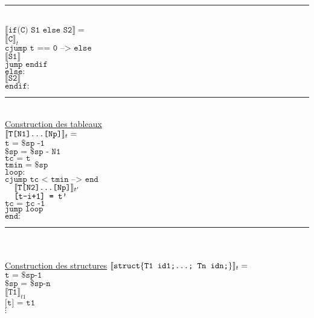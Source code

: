 \documentclass[12pt,twocolumn]{report}
\begin{document}
    \rule{3cm}{0.1pt}\\
    $\llbracket \texttt{if(C) S1 else S2} \rrbracket =$\\
    \hphantom{aaaaaa}$\llbracket \texttt{C} \rrbracket_{t} $\\
    \hphantom{aaaaaa}$\texttt{cjump t == 0 --> else}$\\
    \hphantom{aaaaaa}$\llbracket \texttt{S1} \rrbracket$\\
    \hphantom{aaaaaa}$\texttt{jump endif}$\\
    $\texttt{else}:$\\
    \hphantom{aaaaaa}$\llbracket \texttt{S2} \rrbracket$\\
    $\texttt{endif}:$\\
\rule{9cm}{0.1pt}\\
    \underline{Construction des tableaux}\\
    $\llbracket \texttt{T[N1]\dots[Np]} \rrbracket_t= $\\
    \hphantom{aaaaaa}$\texttt{t = \$sp -1} $\\
    \hphantom{aaaaaa}$\texttt{\$sp = \$sp - N1}$\\
    \hphantom{aaaaaa}$\texttt{tc = t} $\\
    \hphantom{aaaaaa}$\texttt{tmin = \$sp}$\\
    $\texttt{loop:}$\\
    \hphantom{aaaaaa}$\texttt{cjump tc < tmin --> end}$\\
    \hphantom{aaaaaa}$\hphantom{aa}\llbracket \texttt{T[N2]\dots[Np]} \rrbracket_{t'}$\\
    \hphantom{aaaaaa}$\hphantom{aa}\texttt{[t-i+1] = t'}$\\
    \hphantom{aaaaaa}$\texttt{tc = tc -1}$\\
    \hphantom{aaaaaa}$\texttt{jump loop}$\\
    $\texttt{end:}$\\
\rule{9cm}{0.1pt}\\
\hphantom{a}\\
    \underline{Construction des structures}
    $\llbracket \texttt{struct}\lbrace \texttt{T1 id1;\dots; Tn idn;}\rbrace \rrbracket_t= $\\
    $\texttt{t = \$sp-1}$\\
    $\texttt{\$sp = \$sp-n}$\\
    $\llbracket \texttt{T1} \rrbracket_{t1}$\\
    $\texttt{[t] = t1} $\\
    $\vdots$\\
\end{document}
